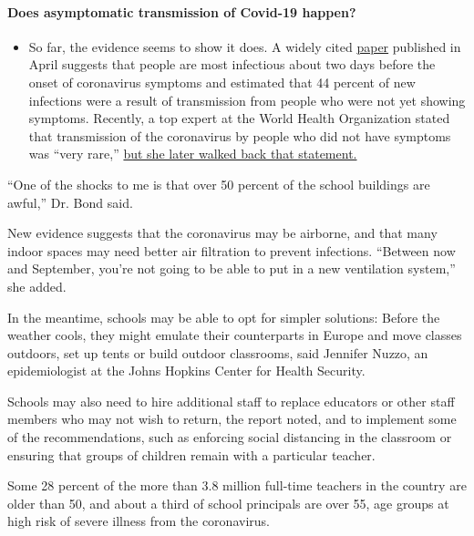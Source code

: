 \begin{itemize}
{  \paragraph{Does asymptomatic transmission of Covid-19
  happen?}\label{does-asymptomatic-transmission-of-covid-19-happen}}

  \begin{itemize}
  \tightlist
  \item
    So far, the evidence seems to show it does. A widely cited
    \href{https://www.nature.com/articles/s41591-020-0869-5}{paper}
    published in April suggests that people are most infectious about
    two days before the onset of coronavirus symptoms and estimated that
    44 percent of new infections were a result of transmission from
    people who were not yet showing symptoms. Recently, a top expert at
    the World Health Organization stated that transmission of the
    coronavirus by people who did not have symptoms was ``very rare,''
    \href{https://www.nytimes3xbfgragh.onion/2020/06/09/world/coronavirus-updates.html?action=click\&pgtype=Article\&state=default\&region=MAIN_CONTENT_3\&context=storylines_faq\#link-1f302e21}{but
    she later walked back that statement.}
  \end{itemize}
\end{itemize}

``One of the shocks to me is that over 50 percent of the school
buildings are awful,'' Dr. Bond said.

New evidence suggests that the coronavirus may be airborne, and that
many indoor spaces may need better air filtration to prevent infections.
``Between now and September, you're not going to be able to put in a new
ventilation system,'' she added.

In the meantime, schools may be able to opt for simpler solutions:
Before the weather cools, they might emulate their counterparts in
Europe and move classes outdoors, set up tents or build outdoor
classrooms, said Jennifer Nuzzo, an epidemiologist at the Johns Hopkins
Center for Health Security.

Schools may also need to hire additional staff to replace educators or
other staff members who may not wish to return, the report noted, and to
implement some of the recommendations, such as enforcing social
distancing in the classroom or ensuring that groups of children remain
with a particular teacher.

Some 28 percent of the more than 3.8 million full-time teachers in the
country are older than 50, and about a third of school principals are
over 55, age groups at high risk of severe illness from the coronavirus.

